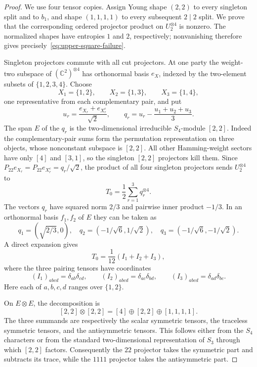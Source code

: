 \begin{proof}
We use four tensor copies.  Assign Young shape $(2,2)$ to every singleton split and to $b_1$, and shape $(1,1,1,1)$ to every subsequent $2\mid2$ split.  We prove that the corresponding ordered projector product on $U_2^{\otimes4}$ is nonzero.  The normalized shapes have entropies $1$ and $2$, respectively; nonvanishing therefore gives precisely~\eqref{eq:upper-square-failure}.

Singleton projectors commute with all cut projectors.  At one party the weight-two subspace of $(\mathbb C^2)^{\otimes4}$ has orthonormal basis $e_X$, indexed by the two-element subsets of $\{1,2,3,4\}$.  Choose
\[
 X_1=\{1,2\},\qquad X_2=\{1,3\},\qquad X_3=\{1,4\},
\]
one representative from each complementary pair, and put
\[
 u_r=\frac{e_{X_r}+e_{X_r^c}}{\sqrt2},\qquad
 q_r=u_r-\frac{u_1+u_2+u_3}{3}.
\]
The span $E$ of the $q_r$ is the two-dimensional irreducible $S_4$-module $[2,2]$.  Indeed the complementary-pair sums form the permutation representation on three objects, whose nonconstant subspace is $[2,2]$.  All other Hamming-weight sectors have only $[4]$ and $[3,1]$, so the singleton $[2,2]$ projectors kill them.  Since $P_{22}e_{X_r}=P_{22}e_{X_r^c}=q_r/\sqrt2$, the product of all four singleton projectors sends $U_2^{\otimes4}$ to
\[
 T_0=\frac12\sum_{r=1}^3q_r^{\otimes4}.
\]
The vectors $q_r$ have squared norm $2/3$ and pairwise inner product $-1/3$.  In an orthonormal basis $f_1,f_2$ of $E$ they can be taken as
\[
 q_1=(\sqrt{2/3},0),\quad
 q_2=(-1/\sqrt6,1/\sqrt2),\quad
 q_3=(-1/\sqrt6,-1/\sqrt2).
\]
A direct expansion gives
\begin{equation}
 T_0=\frac1{12}(I_1+I_2+I_3),
 \label{eq:fourth-moment-pairings}
\end{equation}
where the three pairing tensors have coordinates
\[
 (I_1)_{abcd}=\delta_{ab}\delta_{cd},\qquad
 (I_2)_{abcd}=\delta_{ac}\delta_{bd},\qquad
 (I_3)_{abcd}=\delta_{ad}\delta_{bc}.
\]
Here each of $a,b,c,d$ ranges over $\{1,2\}$.

On $E\otimes E$, the decomposition is
\[
 [2,2]\otimes[2,2]=[4]\oplus[2,2]\oplus[1,1,1,1].
\]
The three summands are respectively the scalar symmetric tensors, the traceless symmetric tensors, and the antisymmetric tensors.  This follows either from the $S_4$ characters or from the standard two-dimensional representation of $S_3$ through which $[2,2]$ factors.  Consequently the $22$ projector takes the symmetric part and subtracts its trace, while the $1111$ projector takes the antisymmetric part.


\end{proof}
